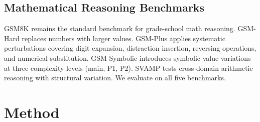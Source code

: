 \documentclass[11pt,a4paper]{article}
\begin{document}
\subsection{Mathematical Reasoning Benchmarks}
GSM8K \citep{cobbe2021gsm8k} remains the standard benchmark for grade-school math reasoning.
GSM-Hard \citep{gao2023pal} replaces numbers with larger values.
GSM-Plus \citep{li2024gsmplus} applies systematic perturbations covering digit expansion, distraction insertion, reversing operations, and numerical substitution.
GSM-Symbolic \citep{shi2023gsmsymbolic} introduces symbolic value variations at three complexity levels (main, P1, P2).
SVAMP \citep{patel2021svamp} tests cross-domain arithmetic reasoning with structural variation.
We evaluate on all five benchmarks.
\section{Method}
\label{sec:method}
\end{document}
